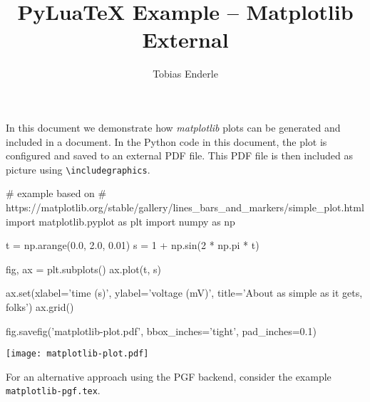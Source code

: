 \documentclass{article}
\title{PyLuaTeX Example -- Matplotlib External}
\author{Tobias Enderle}
\begin{document}
\maketitle

In this document we demonstrate how \emph{matplotlib} plots can be generated and
included in a document. In the Python code in this document, the plot is
configured and saved to an external PDF file. This PDF file is then
included as picture using \verb|\includegraphics|.

\begin{center}
\begin{python}
# example based on
# https://matplotlib.org/stable/gallery/lines_bars_and_markers/simple_plot.html
import matplotlib.pyplot as plt
import numpy as np

t = np.arange(0.0, 2.0, 0.01)
s = 1 + np.sin(2 * np.pi * t)

fig, ax = plt.subplots()
ax.plot(t, s)

ax.set(xlabel='time (s)', ylabel='voltage (mV)',
       title='About as simple as it gets, folks')
ax.grid()

fig.savefig('matplotlib-plot.pdf', bbox_inches='tight', pad_inches=0.1)
\end{python}
\texttt{[image: matplotlib-plot.pdf]}
\end{center}

For an alternative approach using the PGF backend, consider the example
\verb|matplotlib-pgf.tex|.
\end{document}
